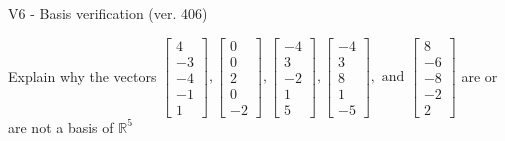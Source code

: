 \begin{exercise}
  \begin{exerciseTitle}V6 - Basis verification (ver. 406)\end{exerciseTitle}
  \begin{exerciseStatement}
    Explain why the vectors \(\left[\begin{array}{r}
4 \\
-3 \\
-4 \\
-1 \\
1
\end{array}\right] , \left[\begin{array}{r}
0 \\
0 \\
2 \\
0 \\
-2
\end{array}\right] , \left[\begin{array}{r}
-4 \\
3 \\
-2 \\
1 \\
5
\end{array}\right] , \left[\begin{array}{r}
-4 \\
3 \\
8 \\
1 \\
-5
\end{array}\right] , \text{ and } \left[\begin{array}{r}
8 \\
-6 \\
-8 \\
-2 \\
2
\end{array}\right]\) are or are not a basis of \(\mathbb{R}^5\)	



\end{exerciseStatement}
\end{exercise}

